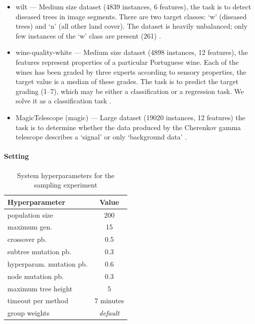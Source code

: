 \begin{itemize}
\item wilt --- Medium size dataset (4839 instances, 6 features), the task is to
detect diseased trees in image segments. There are two target classes: `w' (diseased
trees) and `n' (all other land cover). The dataset is heavily unbalanced; only
few instances of the `w' class are present (261)
\citep{doi:10.1080/01431161.2013.810825}.
\item wine-quality-white --- Medium size dataset (4898 instances, 12 features),
the features represent properties of a particular Portuguese wine. Each of the
wines has been graded by three experts according to sensory properties, the
target value is a median of these grades. The task is to predict the target
grading (1--7), which may be either a classification or a regression task.
We solve it as a classification task \citep{CORTEZ2009547}.
\item MagicTelescope (magic) --- Large dataset (19020 instances, 12 features)
the task is to determine whether the data produced by the Cherenkov gamma
telescope describes a `signal' or only `background data' \citep{BOCK2004511}.
\end{itemize}

\paragraph{Setting}

\begin{table}[ht]

\centering
\caption{System hyperparameters for the sampling experiment}\label{tab04:exp1:setting}
\begin{tabular}{l c}
\toprule
\textbf{\upshape Hyperparameter} & \textbf{Value} \\
\midrule
population size & 200 \\
maximum gen. & 15 \\
crossover pb. & 0.5 \\
subtree mutation pb. & 0.3 \\
hyperparam. mutation pb. & 0.6 \\
node mutation pb. & 0.3 \\
maximum tree height & 5 \\
timeout per method  & 7 minutes \\
group weights & \textit{default} \\
\bottomrule

\end{tabular}

\end{table}

